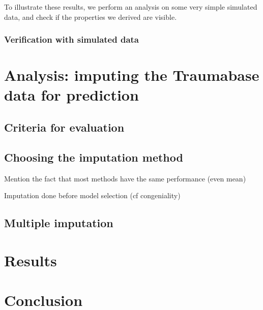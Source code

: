 \documentclass[12pt, a4paper]{memoir}
\begin{document}
To illustrate these results, we perform an analysis on some very simple simulated data, and check if the properties we derived are visible.
		\subsection{Verification with simulated data}

		
\chapter{Analysis: imputing the Traumabase data for prediction}
\label{analysis}
	\section{Criteria for evaluation}
	\section{Choosing the imputation method}
		Mention the fact that most methods have the same performance (even mean)
		
		Imputation done before model selection (cf congeniality)
	\section{Multiple imputation}
	
\chapter{Results}
\label{results}

\chapter*{Conclusion}


\end{document}
